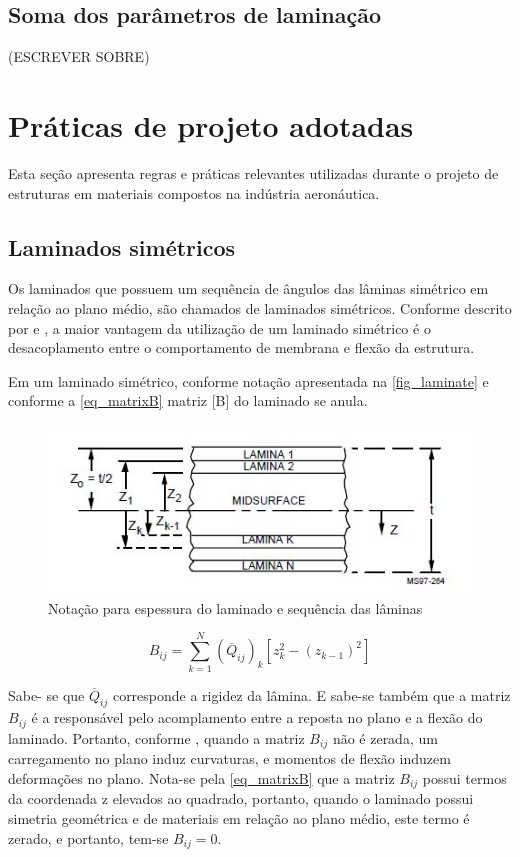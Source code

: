 \subsection{Soma dos parâmetros de laminação}
(ESCREVER SOBRE)

\section{Práticas de projeto adotadas}
Esta seção apresenta regras e práticas relevantes utilizadas durante o projeto de estruturas em materiais compostos na indústria aeronáutica.

\subsection{Laminados simétricos}
Os laminados que possuem um sequência	de ângulos das lâminas simétrico em relação ao plano médio, são chamados de laminados simétricos. Conforme descrito por \cite{mil2002handbook} e \cite{niucomposite}, a maior vantagem da utilização de um laminado simétrico é o desacoplamento entre o comportamento de membrana e flexão da estrutura.

Em um laminado simétrico, conforme notação apresentada na \autoref{fig_laminate} e conforme a \autoref{eq_matrixB} matriz [B] do laminado se anula.

\begin{figure}[h]
	\caption{\label{fig_laminate}Notação para espessura do laminado e sequência das lâminas}
  \centering
  \includegraphics[scale=1.0]{figura/Laminate}
\end{figure}

\begin{equation} \label{eq_matrixB}
B_{ij}
=
\sum_{k=1}^N (\overline{Q}_{ij})_k [z_k^2 - (z_{k-1})^2]
\end{equation}

Sabe- se que $ \overline{Q}_{ij} $ corresponde a rigidez da lâmina. E sabe-se também que a matriz $ B_{ij} $ é a responsável pelo acomplamento entre a reposta no plano e a flexão do laminado. Portanto, conforme \cite{nasa1997guidelines}, quando a matriz $ B_{ij} $ não é zerada, um carregamento no plano induz curvaturas, e momentos de flexão induzem deformações no plano. Nota-se pela \autoref{eq_matrixB} que a matriz $ B_{ij} $ possui termos da coordenada z elevados ao quadrado, portanto, quando o laminado possui simetria geométrica e de materiais em relação ao plano médio, este termo é zerado, e portanto, tem-se $ B_{ij} = 0$.

